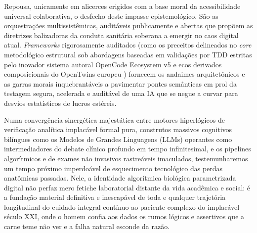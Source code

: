 Repousa, unicamente em alicerces erigidos com a base moral da acessibilidade universal colaborativa, o desfecho deste impasse epistemológico. São as orquestrações multissistêmicas, auditáveis publicamente e abertas que propõem as diretrizes balizadoras da conduta sanitária soberana a emergir no caos digital atual. \textit{Frameworks} rigorosamente auditados (como os preceitos delineados no \textit{core} metodológico estrutural sob abordagens baseadas em validações por TDD estritas pelo inovador sistema autoral OpenCode Ecosystem v5 e ecos derivados composicionais do OpenTwins europeu \cite{robles2023opentwins, infante2025distributed}) fornecem os andaimes arquitetônicos e as garras morais inquebrantáveis a pavimentar pontes semânticas em prol da testagem segura, acelerada e auditável de uma IA que se negue a curvar para desvios estatísticos de lucros estéreis.

Numa convergência sinergética majestática entre motores hiperlógicos de verificação analítica implacável formal pura, construtos massivos cognitivos bilíngues como os Modelos de Grandes Linguagens (LLMs) operantes como intermediadores do debate clínico profundo em tempo infinitesimal, e os pipelines algorítmicos e de exames não invasivos rastreáveis imaculados, testemunharemos um tempo próximo imperdoável de esquecimento tecnológico das perdas anatômicas passadas. Nele, a identidade algorítmica biológica parametrizada digital não perfaz mero fetiche laboratorial distante da vida acadêmica e social: é a fundação material definitiva e inescapável de toda e qualquer trajetória longitudinal do cuidado integral contínuo ao paciente complexo do implacável século XXI, onde o homem confia aos dados os rumos lógicos e assertivos que a carne teme não ver e a falha natural esconde da razão.
